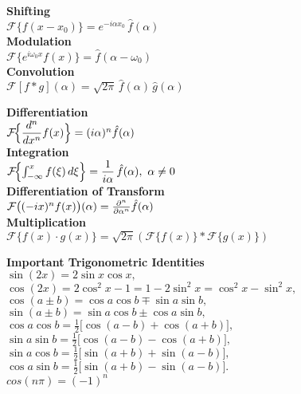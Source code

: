 \documentclass[8pt]{article}
\begin{document}
\begin{multicols}{2}
\begin{minipage}[htp]{0.55\textwidth}
\begin{multicols}{2}
			\textbf{Shifting} \\
			$\mathcal{F}\{f(x - x_0)\} = e^{-i\alpha x_0}\,\hat{f}(\alpha)$ \\[4pt]

			\textbf{Modulation} \\
			$\mathcal{F}\{e^{i\omega_0 x} f(x)\} = \hat{f}(\alpha - \omega_0)$ \\[4pt]

			\textbf{Convolution} \\
			$\mathcal{F}[f * g](\alpha)
				= \sqrt{2\pi} \,\hat{f}(\alpha)\,\hat{g}(\alpha)$ \\[4pt]
			\columnbreak

			\textbf{Differentiation} \\[2pt]
			$\mathcal{F}\!\Bigl\{\dfrac{d^n}{dx^n}f(x)\Bigr\} = (i\alpha)^n \hat{f}(\alpha)$ \\[4pt]

			\textbf{Integration} \\
			$\mathcal{F}\!\Bigl\{\int_{-\infty}^x f(\xi)\,d\xi\Bigr\}
				= \dfrac{1}{i\alpha}\,\hat{f}(\alpha), \ \alpha \neq 0$ \\[4pt]

			\textbf{Differentiation of Transform} \\[2pt]
			$
				\mathcal{F}\big((-ix)^n f(x)\big)(\alpha) = \frac{\partial^n}{\partial \alpha^n} \hat{f}(\alpha) \\[4pt]
			$\\
			\textbf{Multiplication} \\
			$
				\mathcal{F}\{f(x) \cdot g(x)\} = \sqrt{2\pi}\left( \mathcal{F}\{f(x)\} * \mathcal{F}\{g(x)\} \right)
			$ \\[4pt]
		\end{multicols}
	\end{minipage}
	\normalsize
	\noindent \textbf{Important Trigonometric Identities} \\[2pt]
	$\sin(2x) = 2\sin x\cos x,$ \\[3pt]
	$\cos(2x) = 2\cos^2 x - 1 = 1 - 2\sin^2 x = \cos^2 x - \sin^2 x,$ \\[3pt]
	$\cos(a \pm b) = \cos a\cos b \mp \sin a\sin b,$ \\[3pt]
	$\sin(a \pm b) = \sin a\cos b \pm \cos a\sin b,$ \\[3pt]
	$\cos a\cos b = \tfrac{1}{2}\bigl[\cos(a - b) + \cos(a + b)\bigr],$ \\[3pt]
	$\sin a\sin b = \tfrac{1}{2}\bigl[\cos(a - b) - \cos(a + b)\bigr],$ \\[3pt]
	$\sin a\cos b = \tfrac{1}{2}\bigl[\sin(a + b) + \sin(a - b)\bigr],$ \\[3pt]
	$\cos a\sin b = \tfrac{1}{2}\bigl[\sin(a + b) - \sin(a - b)\bigr].$\\[3pt]
	$cos(n \pi) = (-1)^n$
	\normalsize
\end{multicols}
\endgroup
\end{document}
